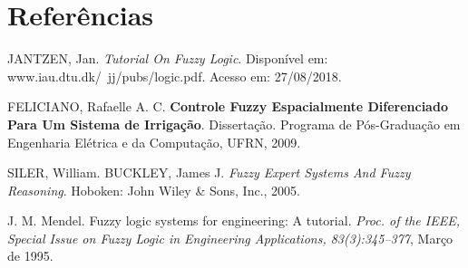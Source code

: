 \section{Referências}

JANTZEN, Jan. \textit{Tutorial On Fuzzy Logic}. Disponível em: www.iau.dtu.dk/~jj/pubs/logic.pdf. Acesso em: 27/08/2018.

FELICIANO, Rafaelle A. C. \textbf{Controle Fuzzy Espacialmente Diferenciado Para Um Sistema de Irrigação}. Dissertação. Programa de Pós-Graduação em Engenharia Elétrica e da Computação, UFRN, 2009.

SILER, William. BUCKLEY, James J. \textit{Fuzzy Expert Systems And Fuzzy Reasoning}. Hoboken: John Wiley \& Sons, Inc., 2005.

J. M. Mendel. Fuzzy logic systems for engineering: A tutorial. \textit{Proc. of the IEEE, Special Issue on Fuzzy Logic in Engineering Applications, 83(3):345–377}, Março de 1995.